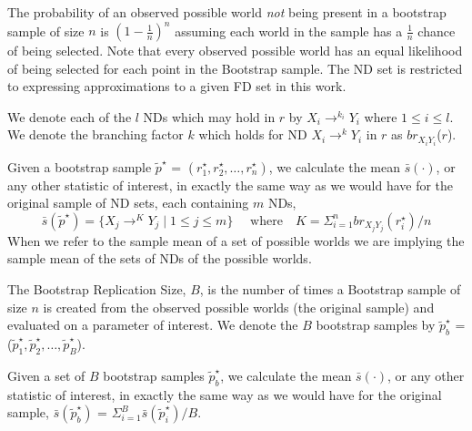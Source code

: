 The probability of an observed possible world {\em not} being
present in a bootstrap sample of size $n$ is $(1 - \frac{1}{n})^n$
assuming each world in the sample has a $\frac{1}{n}$ chance of being
selected.  Note that
every observed possible world has an equal likelihood of being 
selected for each point in the Bootstrap sample. The ND set is
restricted to expressing approximations to a given FD set in this work.

\medskip

We denote each of the $l$ NDs which may hold in
$r$ by $X_i \to^{k_i} Y_i$ where $1 \le i \le l$.
We denote the branching factor $k$ which holds for ND $X_i \to^k Y_i$ in
$r$ as $br_{X_iY_i}$($r$).  
\begin{definition}
\begin{rm}
Given a bootstrap sample {\bf $\tilde{p}^\star$} = \linebreak[4] $(r_1^\star, r_2^\star, \ldots, r_n^\star )$, we calculate the
mean $\bar{s}(\cdot)$, or any other statistic of interest, in exactly the same
way as we would have for the original sample of ND sets, each containing $m$ NDs, 
\[\bar{s}(\tilde{p}^\star) = \{ X_j \to^K Y_j \mid 1 \le j \le m \}\quad\mbox{ where}\quad K = {\Sigma_{i = 1}^n br_{X_jY_j}(r_i^\star)/n}\]
When we refer to the sample mean of a set of possible worlds we are implying
the sample mean of the sets of NDs of the possible worlds.
\end{rm}
\end{definition}


\begin{definition}
\begin{rm}
The Bootstrap Replication Size, $B$, is the number of times a Bootstrap
sample of size $n$ is created from the observed possible worlds (the
original sample) and evaluated on a parameter of interest. We denote the $B$ bootstrap samples by $\tilde{p}^\star_b$ = ({\bf $\tilde{p}^\star_1, \tilde{p}^\star_2, \ldots, \tilde{p}^\star_B$}).
\end{rm}
\end{definition}

\begin{definition}
\begin{rm}
Given a set of $B$ bootstrap samples $\tilde{p}^\star_b$,  
we calculate the mean $\bar{s}(\cdot)$, or any other statistic of 
interest, in exactly the same
way as we would have for the original sample, 
$\bar{s}(\tilde{p}^\star_b)$  = $\Sigma_{i = 1}^B \bar{s}(\tilde{p}^\star_i) / B$.
\end{rm}
\end{definition}


